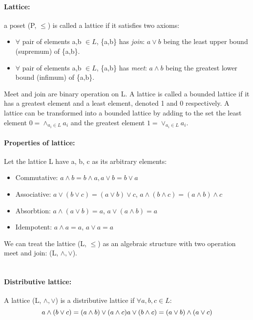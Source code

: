 \documentclass[26pt,fleqn,]{article}
\begin{document}
\paragraph{Lattice: } a poset (P, \(\le\)) is called a lattice if it satisfies two axioms:
\begin{itemize}
	\item \(\forall\) pair of elements a,b \(\in L\), \{a,b\} has {\em join}: \(a \vee b\) being the
		least upper bound (supremum) of \{a,b\}.
	\item \(\forall\) pair of elements a,b \(\in L\), \{a,b\} has {\em meet}: \(a \wedge b\) being 
		the greatest lower bound (infimum) of \{a,b\}.
\end{itemize}

Meet and join are binary operation on L. A lattice is called a bounded lattice if it has a greatest 
element and a least element, denoted 1 and 0 respectively. A lattice can be transformed into a bounded
lattice by adding to the set the least element \(0 = \wedge_{a_i \in L} a_i\) and the greatest element
\(1 = \vee_{a_i \in L} a_i\).
\paragraph{Properties of lattice: } Let the lattice L have a, b, c as its arbitrary elements:
\begin{itemize}
	\item Commutative: \(a \wedge b = b \wedge a, a \vee b = b \vee a\)
	\item Associative: \(a \vee (b \vee c) = (a \vee b) \vee c \), 
			\(a \wedge (b \wedge c) = (a \wedge b) \wedge c \)
	\item Absorbtion: \(a \wedge (a \vee b) = a\), \(a \vee (a \wedge b) = a\)
	\item Idempotent: \(a \wedge a = a\), \(a \vee a = a\)
\end{itemize}

We can treat the lattice (L, \(\le\)) as an algebraic structure with two operation meet and join: (L,
\(\wedge, \vee\)).\\\\

\paragraph{Distributive lattice: } A lattice (L, \(\wedge, \vee\)) is a distributive lattice if \(
\forall a,b,c \in L\): \\
\[ a \wedge (b \vee c) = (a \wedge b) \vee (a \wedge c)\\
a \vee (b \wedge c) = (a \vee b) \wedge (a \vee c)\\\]
\\
\end{document}
